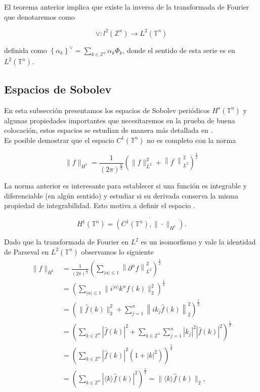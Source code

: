 \documentclass[12pt]{article}
\newcommand\Z{\ensuremath{\mathbb{Z}}}
\newcommand\T{\mathbb{T}}
\renewcommand{\hat}{\widehat}
\begin{document}
El teorema anterior implica que existe la inversa de la transformada de Fourier que denotaremos como

$$
\vee: l^2\left(\mathbb{Z}^n\right) \rightarrow L^2\left(\mathbb{T}^n\right)
$$

definida como $\left\{\alpha_k\right\}^{\vee}=\displaystyle\sum_{k \in \mathbb{Z}^n} \alpha_k \Phi_k$, donde el sentido de esta serie es en $L^2(\T^n)$.


\subsection{Espacios de Sobolev}

En esta subsección presentamos los espacios de Sobolev periódicos $H^s(\T^n)$ y algunas propiedades importantes que necesitaremos en la prueba de buena colocación, estos espacios se estudian de manera más detallada  en \cite{ioriojunior2001equacoes}.\\

Es posible demostrar que el espacio $C^1(\T^n)$ no es completo con la norma

$$
\|f\|_{H^1}=\frac{1}{(2 \pi)^{\frac{n}{2}}}\left(\|f\|_{L^2}^2+\left\|f^{\prime}\right\|_{L^2}^2\right)^{\frac{1}{2}}
$$


La norma anterior es interesante para establecer si una función es integrable y diferenciable (en algún sentido) y estudiar si su derivada conserva la misma propiedad de integrabilidad. Esto motiva a definir el espacio \cite{ogrianoc}.

$$
H^1(\T^n)=\overline{\left(C^1(\T^n),\|\cdot\|_{H^1}\right)}.
$$

Dado que la transformada de Fourier en $L^2$ es un isomorfismo y vale la identidad de Parseval en $L^2(\T^n)$ observamos lo siguiente\\


$$
\begin{aligned}
 \|f\|_{H^{1}}&=\frac{1}{(2 \pi)^{\frac{n}{2}}}\left(\sum_{|\alpha|\leq1}\left\|\partial^\alpha f\right\|_{L^2}^2\right)^{\frac{1}{2}} \\
& =\left(\sum_{|\alpha| \leq 1}\| i^{|\alpha|}k^{\alpha} \hat{f}(k) \|_2^2\right)^{\frac{1}{2}} \\
& =\left(\|\widehat{f}(k)\|_2^2+\sum_{j=1}^n\left\|i k_j \hat{f}(k)\right\|_2^2\right)^{\frac{1}{2}} \\
& =\left(\sum_{k \in \Z^n}|\hat{f}(k)|^2+\sum_{k \in \Z^n} \sum_{j=1}^n\left|k_j\right|^2|\hat{f}(k)|^2\right)^{\frac{1}{2}} \\
& =\left(\sum_{k \in \Z^n}|\hat{f}(k)|^2\left(1+|k|^2\right)\right)^{\frac{1}{2}}\\
&=\left(\sum_{k\in\Z^{n}} |\langle k \rangle \hat{f}(k)|^2\right)^{\frac{1}{2}}=\|\langle k\rangle\hat{f}(k)\|_2,
\end{aligned}
$$
\end{document}
